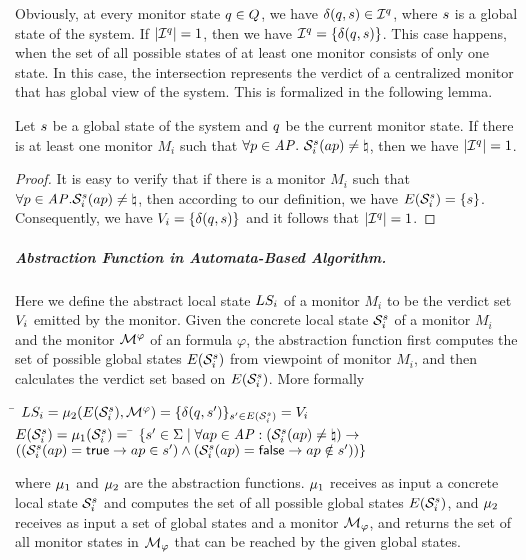 Obviously, at every monitor state $q \in Q$, we have $\delta(q, 
s) \in \mathcal{I}^q$, where $s$ is a global state of the system. If
$|\mathcal{I}^q| =1$, then we have $\mathcal{I}^q = \{\delta(q, 
s)\}$. This case happens, when the set of all possible states of at least 
one monitor consists of only one state. In this case, the intersection 
represents the verdict of a centralized monitor that has global view of the 
system. This is formalized in the following lemma.

\begin{lemma} 
\label{lem:fullinfo}
Let $s$ be a global state of the system and $q$ be the current 
monitor state. If there is at least one monitor $M_i$ such that $\forall p \in 
\mathit{AP}. ~ \mathcal{S}_i^s(ap) \neq \natural$, then we have $|\mathcal{I}^q| = 1$.
\end{lemma}

\begin{proof} 
It is easy to verify that if there is a monitor $M_i$ such that $\forall p \in 
\mathit{AP}. \mathcal{S}_i^s(ap) \neq \natural$, then according to our definition, we 
have $E(\mathcal{S}_i^s) = \{s\}$. Consequently, we have 
$V_i =  \{\delta(q, s)\}$ and it follows that $|\mathcal{I}^q| = 
1$.
\end{proof}


\subparagraph{Abstraction Function in Automata-Based Algorithm.} Here we define 
the abstract local state $LS_i$ of a monitor $M_i$ to be the verdict set 
$V_i$ emitted by the monitor. Given the concrete local state 
$\mathcal{S}_i^s $ of a monitor $M_i $ and the \LTLtri monitor 
$\mathcal{M}^\varphi$ of an \LTL formula $\varphi$, the abstraction function first 
computes the set of possible global states $E(\mathcal{S}_i^s)$ from 
viewpoint of monitor $M_i$, and then calculates the verdict set based on 
$E(\mathcal{S}_i^s)$. More formally

\begin{tabbing}
\= $LS_i = \mu_2(E(\mathcal{S}_i^s), \mathcal{M}^\varphi) = \{\delta(q, 
s')\}_{s' \in E(\mathcal{S}_i^s)} = V_i$ \\
\> $E(\mathcal{S}_i^s) = \mu_1(\mathcal{S}_i^s) = $ \= $\{ s' \in \Sigma \mid \forall ap \in \mathit{AP}: 
(\mathcal{S}_i^s(ap) \neq \natural) \rightarrow$\\
\>\> $( (\mathcal{S}_i^s(ap) = \mathsf{true} \rightarrow ap \in s') \wedge  
(\mathcal{S}_i^s(ap) = \mathsf{false} \rightarrow ap \notin s') ) \}$
\end{tabbing}
where $\mu_1$ and $\mu_2$ are the abstraction functions. $\mu_1$ receives as input a concrete local state $\mathcal{S}_i^s$ and computes the set of all possible global states $E(\mathcal{S}_i^s)$, and $\mu_2$ receives as input a set of global states and a monitor $\mathcal{M}_\varphi$, and returns the set of all monitor states in $\mathcal{M}_\varphi$ that can be reached by the given global states.


